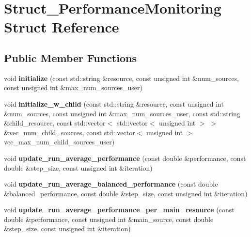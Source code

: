 \hypertarget{structStruct__PerformanceMonitoring}{\section{Struct\-\_\-\-Performance\-Monitoring Struct Reference}
\label{structStruct__PerformanceMonitoring}
}
\subsection*{Public Member Functions}
\begin{DoxyCompactItemize}
\item 
\hypertarget{structStruct__PerformanceMonitoring_a97d5962047f0577a68ddd420b1da8a1e}{void {\bfseries initialize} (const std\-::string \&resource, const unsigned int \&num\-\_\-sources, const unsigned int \&max\-\_\-num\-\_\-sources\-\_\-user)}\label{structStruct__PerformanceMonitoring_a97d5962047f0577a68ddd420b1da8a1e}

\item 
\hypertarget{structStruct__PerformanceMonitoring_aa7963e7c54d30095a7283bbf49f4a61b}{void {\bfseries initialize\-\_\-w\-\_\-child} (const std\-::string \&resource, const unsigned int \&num\-\_\-sources, const unsigned int \&max\-\_\-num\-\_\-sources\-\_\-user, const std\-::string \&child\-\_\-resource, const std\-::vector$<$ std\-::vector$<$ unsigned int $>$ $>$ \&vec\-\_\-num\-\_\-child\-\_\-sources, const std\-::vector$<$ unsigned int $>$ vec\-\_\-max\-\_\-num\-\_\-child\-\_\-sources\-\_\-user)}\label{structStruct__PerformanceMonitoring_aa7963e7c54d30095a7283bbf49f4a61b}

\item 
\hypertarget{structStruct__PerformanceMonitoring_adcdd8d9911b6ef408cfe6680ab1fda43}{void {\bfseries update\-\_\-run\-\_\-average\-\_\-performance} (const double \&performance, const double \&step\-\_\-size, const unsigned int \&iteration)}\label{structStruct__PerformanceMonitoring_adcdd8d9911b6ef408cfe6680ab1fda43}

\item 
\hypertarget{structStruct__PerformanceMonitoring_a73b2ca8763d02a85aa900c17c2187d18}{void {\bfseries update\-\_\-run\-\_\-average\-\_\-balanced\-\_\-performance} (const double \&balanced\-\_\-performance, const double \&step\-\_\-size, const unsigned int \&iteration)}\label{structStruct__PerformanceMonitoring_a73b2ca8763d02a85aa900c17c2187d18}

\item 
\hypertarget{structStruct__PerformanceMonitoring_a19680cdaf279198b2065f97045aa7861}{void {\bfseries update\-\_\-run\-\_\-average\-\_\-performance\-\_\-per\-\_\-main\-\_\-resource} (const double \&performance, const unsigned int \&main\-\_\-source, const double \&step\-\_\-size, const unsigned int \&iteration)}\label{structStruct__PerformanceMonitoring_a19680cdaf279198b2065f97045aa7861}


\end{DoxyCompactItemize}
